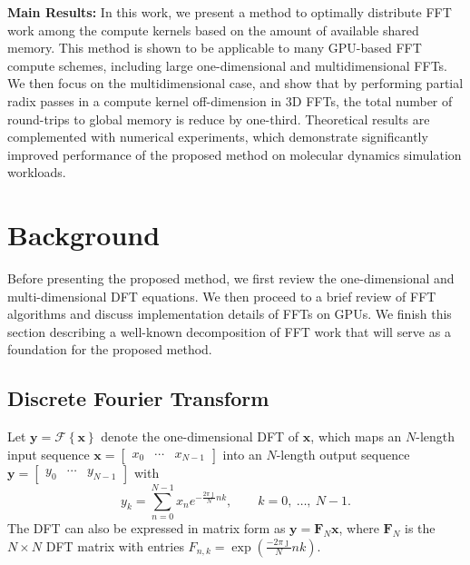 \documentclass[11pt, onecolumn, journal,compsoc]{IEEEtran}
\theoremstyle{problemstyle}
\begin{document}
\textbf{Main Results:} In this work, we present a method to optimally
distribute FFT work among the compute kernels based on the amount of
available shared memory. This method is shown to be applicable to many
GPU-based FFT compute schemes, including large one-dimensional and
multidimensional FFTs. We then focus on the multidimensional case, and
show that by performing partial radix passes in a compute kernel
off-dimension in 3D FFTs, the total number of
round-trips to global memory is reduce by one-third. Theoretical results are complemented with numerical experiments, which demonstrate significantly improved performance of the proposed method on molecular dynamics simulation workloads.

\section{Background}

Before presenting the proposed method, we first review the one-dimensional and multi-dimensional DFT equations. We then proceed to a brief review of FFT algorithms and discuss implementation details of FFTs on GPUs. We finish this section describing a well-known decomposition of FFT work that will serve as a foundation for the proposed method. 
\subsection{Discrete Fourier Transform}
Let $\bm{y} = \mathcal{F}\left\{ \bm{x} \right\}$ denote the one-dimensional DFT of $\bm{x}$, which maps an $N$-length input sequence $\bm{x} = \begin{bmatrix} x_0 &  \cdots & x_{N-1} \end{bmatrix}$ into an $N$-length output sequence $\bm{y} = \begin{bmatrix} y_0 & \cdots & y_{N-1} \end{bmatrix}$ with
\begin{equation}
y_k = \sum_{n=0}^{N-1}{x_n e^{-\frac{2 \pi \jmath}{N}nk}}, \qquad k = 0, \ \ldots, \ N-1.
\label{eq:dft}
\end{equation}
The DFT can also be expressed in matrix form as $\bm{y} = \bm{F}_N \bm{x}$, where $\bm{F}_N$ is the $N \times N$ DFT matrix with entries $F_{n,k} = \exp (\frac{-2\pi \jmath}{N} nk )$.
\end{document}

